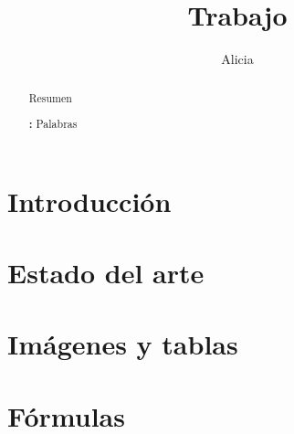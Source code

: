 \documentclass[]{article}
\newenvironment{keywords}
{\par\noindent\small\textbf{\keywordsname:}}
{\par}
\begin{document}

\title{Trabajo}

\author{Alicia}



\maketitle              


\begin{abstract}
Resumen
\begin{keywords}
	Palabras
\end{keywords}


\end{abstract}


\section{Introducción}

\section{Estado del arte}

\section{Imágenes y tablas}

\section{Fórmulas}

%
%
\end{document}
